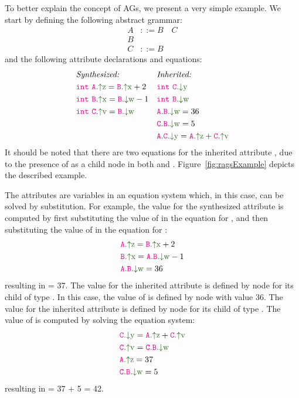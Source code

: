 To better explain the concept of AGs, we present a very simple example.
We start by defining the following abstract grammar:
    \begin{align*}
        A& ::= B \quad C \\
        B& \\
        C& ::= B
    \end{align*}
and the following attribute declarations and equations:
    \begin{align*}
        &\textit{Synthesized:}  && \textit{Inherited:} \\
        &\astnode{int} \ \Asyn{A}{z} = \Asyn{B}{x} + 2  &&\astnode{int} \ \Ainh{C}{y} \\
        &\astnode{int} \ \Asyn{B}{x} = \Ainh{B}{w} -1   &&\astnode{int} \ \Ainh{B}{w}  \\
       &\astnode{int} \ \Asyn{C}{v} = \Ainh{B}{w}   & &\Ainhdef{A}{B}{w} = 36\\
        & && \Ainhdef{C}{B}{w} = 5\\
        &&& \Ainhdef{A}{C}{y} = \Asyn{A}{z} + \Asyn{C}{v} \\
    \end{align*}
It should be noted that there are two equations for the inherited attribute ,
due to the presence of  as a child node in both  and .
Figure~\ref{fig:ragsExample} depicts the described example.

The attributes are variables in an equation system which, in this case, can be solved by substitution.
For example, the value for the synthesized attribute  is computed by first
substituting the value of  in the equation for , and then
substituting the value of  in the equation for :
\begin{align*}
    &\Asyn{A}{z} = \Asyn{B}{x} + 2 \\
    &\Asyn{B}{x} = \Ainhdef{A}{B}{w} - 1 \\
    &\Ainhdef{A}{B}{w} = 36
\end{align*}
resulting in  = 37. The value for the inherited attribute  is defined by node  for
its child of type . In this case, the value of  is defined by node 
with value 36.
The value for the inherited attribute  is defined by node  for
its child of type . The value of  is computed by solving the equation system:
\begin{align*}
    &\Ainh{C}{y} = \Asyn{A}{z} + \Asyn{C}{v} \\
    &\Asyn{C}{v} = \Ainhdef{C}{B}{w}\\
    &\Asyn{A}{z} = 37 \\
    &\Ainhdef{C}{B}{w}  = 5
\end{align*}
resulting in  = 37 + 5 = 42.

